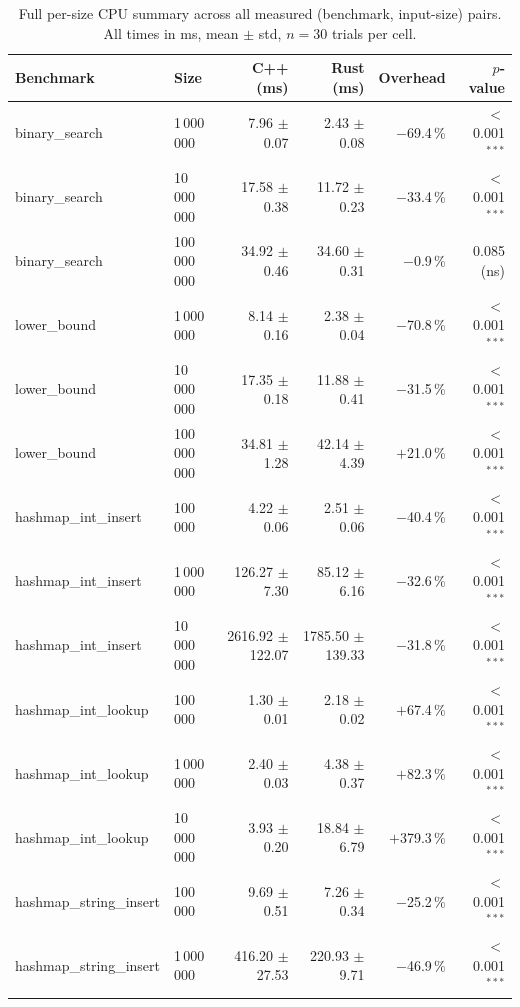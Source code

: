 \documentclass{article}
\begin{document}
\begin{table}[htbp]
\caption{Full per-size CPU summary across all measured
         (benchmark, input-size) pairs.
         All times in ms, mean $\pm$ std, $n=30$ trials per cell.}
\label{tab:cpu_full}
\centering
\small
\begin{tabular}{llrrrr}
\toprule
Benchmark & Size & C++ (ms) & Rust (ms) & Overhead & $p$-value \\
\midrule
binary\_search           & 1\,000\,000   & 7.96 $\pm$ 0.07   & 2.43 $\pm$ 0.08   & $-$69.4\,\%  & $<$0.001$^{***}$ \\
binary\_search           & 10\,000\,000  & 17.58 $\pm$ 0.38  & 11.72 $\pm$ 0.23  & $-$33.4\,\%  & $<$0.001$^{***}$ \\
binary\_search           & 100\,000\,000 & 34.92 $\pm$ 0.46  & 34.60 $\pm$ 0.31  & $-$0.9\,\%   & 0.085 (ns) \\
lower\_bound             & 1\,000\,000   & 8.14 $\pm$ 0.16   & 2.38 $\pm$ 0.04   & $-$70.8\,\%  & $<$0.001$^{***}$ \\
lower\_bound             & 10\,000\,000  & 17.35 $\pm$ 0.18  & 11.88 $\pm$ 0.41  & $-$31.5\,\%  & $<$0.001$^{***}$ \\
lower\_bound             & 100\,000\,000 & 34.81 $\pm$ 1.28  & 42.14 $\pm$ 4.39  & $+$21.0\,\%  & $<$0.001$^{***}$ \\
hashmap\_int\_insert     & 100\,000      & 4.22 $\pm$ 0.06   & 2.51 $\pm$ 0.06   & $-$40.4\,\%  & $<$0.001$^{***}$ \\
hashmap\_int\_insert     & 1\,000\,000   & 126.27 $\pm$ 7.30 & 85.12 $\pm$ 6.16  & $-$32.6\,\%  & $<$0.001$^{***}$ \\
hashmap\_int\_insert     & 10\,000\,000  & 2616.92 $\pm$ 122.07 & 1785.50 $\pm$ 139.33 & $-$31.8\,\% & $<$0.001$^{***}$ \\
hashmap\_int\_lookup     & 100\,000      & 1.30 $\pm$ 0.01   & 2.18 $\pm$ 0.02   & $+$67.4\,\%  & $<$0.001$^{***}$ \\
hashmap\_int\_lookup     & 1\,000\,000   & 2.40 $\pm$ 0.03   & 4.38 $\pm$ 0.37   & $+$82.3\,\%  & $<$0.001$^{***}$ \\
hashmap\_int\_lookup     & 10\,000\,000  & 3.93 $\pm$ 0.20   & 18.84 $\pm$ 6.79  & $+$379.3\,\% & $<$0.001$^{***}$ \\
hashmap\_string\_insert  & 100\,000      & 9.69 $\pm$ 0.51   & 7.26 $\pm$ 0.34   & $-$25.2\,\%  & $<$0.001$^{***}$ \\
hashmap\_string\_insert  & 1\,000\,000   & 416.20 $\pm$ 27.53 & 220.93 $\pm$ 9.71 & $-$46.9\,\%  & $<$0.001$^{***}$ \\

\end{tabular}
\end{table}
\end{document}
